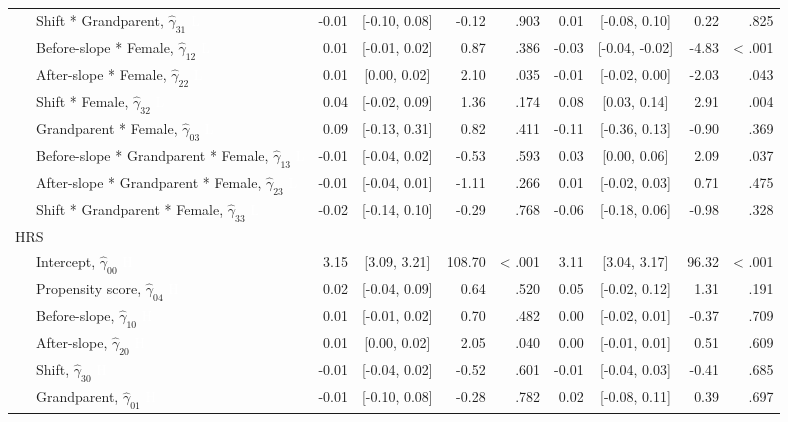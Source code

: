 \documentclass[
  english,
  man, noextraspace]{apa7}
\newenvironment{lltable}{\begin{landscape}\begin{center}\begin{ThreePartTable}}{\end{ThreePartTable}\end{center}\end{landscape}}
\begin{document}
\begin{appendix}
\begin{lltable}
{\begin{longtable}{lrcrrrcrr}
\ \ \ Shift * Grandparent, $\hat{\gamma}_{31}$ \textcolor{white}{L} & -0.01 & [-0.10, 0.08] & -0.12 & .903 & 0.01 & [-0.08, 0.10] & 0.22 & .825\\
\ \ \ Before-slope * Female, $\hat{\gamma}_{12}$ \textcolor{white}{L} & 0.01 & [-0.01, 0.02] & 0.87 & .386 & -0.03 & [-0.04, -0.02] & -4.83 & < .001\\
\ \ \ After-slope * Female, $\hat{\gamma}_{22}$ \textcolor{white}{L} & 0.01 & [0.00, 0.02] & 2.10 & .035 & -0.01 & [-0.02, 0.00] & -2.03 & .043\\
\ \ \ Shift * Female, $\hat{\gamma}_{32}$ \textcolor{white}{L} & 0.04 & [-0.02, 0.09] & 1.36 & .174 & 0.08 & [0.03, 0.14] & 2.91 & .004\\
\ \ \ Grandparent * Female, $\hat{\gamma}_{03}$ \textcolor{white}{L} & 0.09 & [-0.13, 0.31] & 0.82 & .411 & -0.11 & [-0.36, 0.13] & -0.90 & .369\\
\ \ \ Before-slope * Grandparent * Female, $\hat{\gamma}_{13}$ \textcolor{white}{L} & -0.01 & [-0.04, 0.02] & -0.53 & .593 & 0.03 & [0.00, 0.06] & 2.09 & .037\\
\ \ \ After-slope * Grandparent * Female, $\hat{\gamma}_{23}$ \textcolor{white}{L} & -0.01 & [-0.04, 0.01] & -1.11 & .266 & 0.01 & [-0.02, 0.03] & 0.71 & .475\\
\ \ \ Shift * Grandparent * Female, $\hat{\gamma}_{33}$ \textcolor{white}{L} & -0.02 & [-0.14, 0.10] & -0.29 & .768 & -0.06 & [-0.18, 0.06] & -0.98 & .328\\
HRS &  &  &  &  &  &  &  & \\
\ \ \ Intercept, $\hat{\gamma}_{00}$ \textcolor{white}{H} & 3.15 & [3.09, 3.21] & 108.70 & < .001 & 3.11 & [3.04, 3.17] & 96.32 & < .001\\
\ \ \ Propensity score, $\hat{\gamma}_{04}$ \textcolor{white}{H} & 0.02 & [-0.04, 0.09] & 0.64 & .520 & 0.05 & [-0.02, 0.12] & 1.31 & .191\\
\ \ \ Before-slope, $\hat{\gamma}_{10}$ \textcolor{white}{H} & 0.01 & [-0.01, 0.02] & 0.70 & .482 & 0.00 & [-0.02, 0.01] & -0.37 & .709\\
\ \ \ After-slope, $\hat{\gamma}_{20}$ \textcolor{white}{H} & 0.01 & [0.00, 0.02] & 2.05 & .040 & 0.00 & [-0.01, 0.01] & 0.51 & .609\\
\ \ \ Shift, $\hat{\gamma}_{30}$ \textcolor{white}{H} & -0.01 & [-0.04, 0.02] & -0.52 & .601 & -0.01 & [-0.04, 0.03] & -0.41 & .685\\
\ \ \ Grandparent, $\hat{\gamma}_{01}$ \textcolor{white}{H} & -0.01 & [-0.10, 0.08] & -0.28 & .782 & 0.02 & [-0.08, 0.11] & 0.39 & .697\\

\end{longtable}}
\end{lltable}
\end{appendix}
\end{document}
